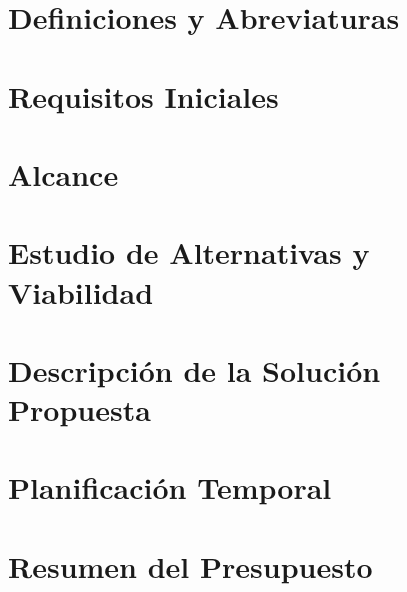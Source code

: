 \chapter{Definiciones y Abreviaturas}


\chapter{Requisitos Iniciales}


\chapter{Alcance}


\chapter{Estudio de Alternativas y Viabilidad}



\chapter{Descripción de la Solución Propuesta}


\chapter{Planificación Temporal}


\chapter{Resumen del Presupuesto}

